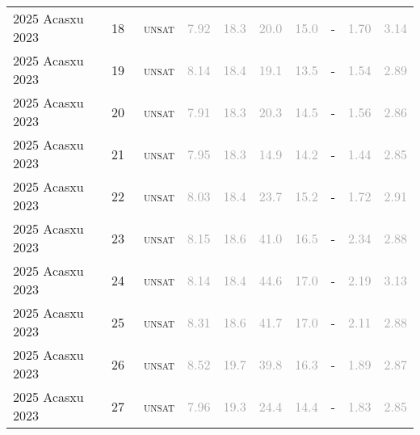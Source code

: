 \begin{center}
{\begin{longtable}{@{}llllllllll@{}}
2025 Acasxu 2023 & 18 & ~\textsc{unsat} & \textcolor{darkgray}{7.92} & \textcolor{darkgray}{18.3} & \textcolor{darkgray}{20.0} & \textcolor{darkgray}{15.0} & - & \textcolor{darkgray}{1.70} & \textcolor{darkgray}{3.14} \\
2025 Acasxu 2023 & 19 & ~\textsc{unsat} & \textcolor{darkgray}{8.14} & \textcolor{darkgray}{18.4} & \textcolor{darkgray}{19.1} & \textcolor{darkgray}{13.5} & - & \textcolor{darkgray}{1.54} & \textcolor{darkgray}{2.89} \\
2025 Acasxu 2023 & 20 & ~\textsc{unsat} & \textcolor{darkgray}{7.91} & \textcolor{darkgray}{18.3} & \textcolor{darkgray}{20.3} & \textcolor{darkgray}{14.5} & - & \textcolor{darkgray}{1.56} & \textcolor{darkgray}{2.86} \\
2025 Acasxu 2023 & 21 & ~\textsc{unsat} & \textcolor{darkgray}{7.95} & \textcolor{darkgray}{18.3} & \textcolor{darkgray}{14.9} & \textcolor{darkgray}{14.2} & - & \textcolor{darkgray}{1.44} & \textcolor{darkgray}{2.85} \\
2025 Acasxu 2023 & 22 & ~\textsc{unsat} & \textcolor{darkgray}{8.03} & \textcolor{darkgray}{18.4} & \textcolor{darkgray}{23.7} & \textcolor{darkgray}{15.2} & - & \textcolor{darkgray}{1.72} & \textcolor{darkgray}{2.91} \\
2025 Acasxu 2023 & 23 & ~\textsc{unsat} & \textcolor{darkgray}{8.15} & \textcolor{darkgray}{18.6} & \textcolor{darkgray}{41.0} & \textcolor{darkgray}{16.5} & - & \textcolor{darkgray}{2.34} & \textcolor{darkgray}{2.88} \\
2025 Acasxu 2023 & 24 & ~\textsc{unsat} & \textcolor{darkgray}{8.14} & \textcolor{darkgray}{18.4} & \textcolor{darkgray}{44.6} & \textcolor{darkgray}{17.0} & - & \textcolor{darkgray}{2.19} & \textcolor{darkgray}{3.13} \\
2025 Acasxu 2023 & 25 & ~\textsc{unsat} & \textcolor{darkgray}{8.31} & \textcolor{darkgray}{18.6} & \textcolor{darkgray}{41.7} & \textcolor{darkgray}{17.0} & - & \textcolor{darkgray}{2.11} & \textcolor{darkgray}{2.88} \\
2025 Acasxu 2023 & 26 & ~\textsc{unsat} & \textcolor{darkgray}{8.52} & \textcolor{darkgray}{19.7} & \textcolor{darkgray}{39.8} & \textcolor{darkgray}{16.3} & - & \textcolor{darkgray}{1.89} & \textcolor{darkgray}{2.87} \\
2025 Acasxu 2023 & 27 & ~\textsc{unsat} & \textcolor{darkgray}{7.96} & \textcolor{darkgray}{19.3} & \textcolor{darkgray}{24.4} & \textcolor{darkgray}{14.4} & - & \textcolor{darkgray}{1.83} & \textcolor{darkgray}{2.85} \\

\end{longtable}}
\end{center}
